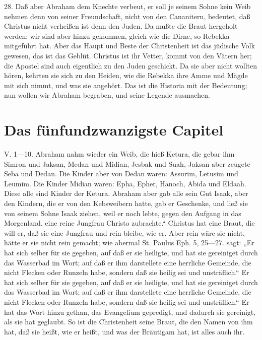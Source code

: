 28. Daß aber Abraham dem Knechte verbeut, er soll je seinem Sohne kein Weib nehmen denn von seiner Freundschaft, nicht von den Cananitern, bedeutet, daß Christus nicht verheißen ist denn den Juden. Da mußte die Braut hergeholt werden; wir sind aber hinzu gekommen, gleich wie die Dirne, so Rebekka mitgeführt hat. Aber das Haupt und Beste der Christenheit ist das jüdische Volk gewesen, das ist das Geblüt. Christus ist ihr Vetter, kommt von den Vätern her; die Apostel sind auch eigentlich zu den Juden geschickt. Da sie aber nicht wollten hören, kehrten sie sich zu den Heiden, wie die Rebekka ihre Amme und Mägde mit sich nimmt, und was sie angehört. Das ist die Historia mit der Bedeutung; nun wollen wir Abraham begraben, und seine Legende ausmachen.

\section{Das fünfundzwanzigste Capitel}

V. 1—10. Abraham nahm wieder ein Weib, die hieß Ketura, die gebar ihm Simron und Jaksan, Medan und Midian, Jesbak und Suah, Jaksan aber zeugete Seba und Dedan. Die Kinder aber von Dedan waren: Assurim, Letusim und Leumim. Die Kinder Midian waren: Epha, Epher, Hanoch, Abida und Eldaah. Diese alle sind Kinder der Ketura. Abraham aber gab alle sein Gut Isaak, aber den Kindern, die er von den Kebsweibern hatte, gab er Geschenke, und ließ sie von seinem Sohne Isaak ziehen, weil er noch lebte, gegen den Aufgang in das Morgenland.
eine reine Jungfrau Christo zubrachte.“ Christus hat eine Braut, die will er, daß sie eine Jungfrau und rein bleibe, wie er. Aber rein wäre sie nicht, hätte er sie nicht rein gemacht; wie abermal St. Paulus Eph. 5, 25—27. sagt: „Er hat sich selber für sie gegeben, auf daß er sie heiligte, und hat sie gereiniget durch das Wasserbad im Wort; auf daß er ihm darstellete eine herrliche Gemeinde, die nicht Flecken oder Runzeln habe, sondern daß sie heilig sei und unsträflich.“ Er hat sich selber für sie gegeben, auf daß er sie heiligte, und hat sie gereiniget durch das Wasserbad im Wort; auf daß er ihm darstellete eine herrliche Gemeinde, die nicht Flecken oder Runzeln habe, sondern daß sie heilig sei und unsträflich.“ Er hat das Wort hinzu gethan, das Evangelium gepredigt, und dadurch sie gereinigt, als sie hat geglaubt. So ist die Christenheit seine Braut, die den Namen von ihm hat, daß sie heißt, wie er heißt, und was der Bräutigam hat, ist alles auch ihr.


